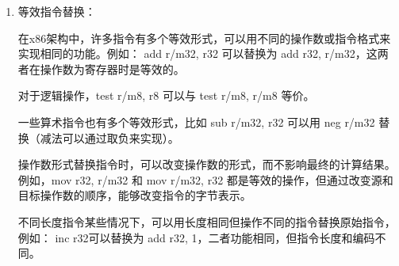 \begin{enumerate}

\item 等效指令替换：


在x86架构中，许多指令有多个等效形式，可以用不同的操作数或指令格式来实现相同的功能。例如：
add r/m32, r32 可以替换为 add r32, r/m32，这两者在操作数为寄存器时是等效的。


对于逻辑操作，test r/m8, r8 可以与 test r/m8, r/m8 等价。


一些算术指令也有多个等效形式，比如 sub r/m32, r32 可以用 neg r/m32 替换（减法可以通过取负来实现）。


操作数形式替换指令时，可以改变操作数的形式，而不影响最终的计算结果。例如，mov r32, r/m32 和 mov r/m32, r32 都是等效的操作，但通过改变源和目标操作数的顺序，能够改变指令的字节表示。


不同长度指令某些情况下，可以用长度相同但操作不同的指令替换原始指令，例如：
inc r32可以替换为 add r32, 1，二者功能相同，但指令长度和编码不同。



\end{enumerate}
